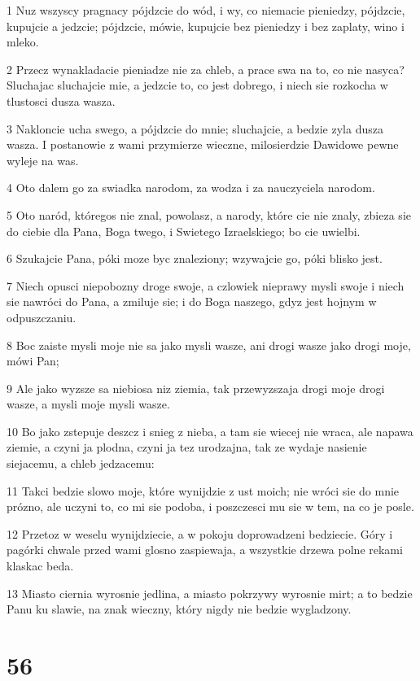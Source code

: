 \par 1 Nuz wszyscy pragnacy pójdzcie do wód, i wy, co niemacie pieniedzy, pójdzcie, kupujcie a jedzcie; pójdzcie, mówie, kupujcie bez pieniedzy i bez zaplaty, wino i mleko.
\par 2 Przecz wynakladacie pieniadze nie za chleb, a prace swa na to, co nie nasyca? Sluchajac sluchajcie mie, a jedzcie to, co jest dobrego, i niech sie rozkocha w tlustosci dusza wasza.
\par 3 Nakloncie ucha swego, a pójdzcie do mnie; sluchajcie, a bedzie zyla dusza wasza. I postanowie z wami przymierze wieczne, milosierdzie Dawidowe pewne wyleje na was.
\par 4 Oto dalem go za swiadka narodom, za wodza i za nauczyciela narodom.
\par 5 Oto naród, któregos nie znal, powolasz, a narody, które cie nie znaly, zbieza sie do ciebie dla Pana, Boga twego, i Swietego Izraelskiego; bo cie uwielbi.
\par 6 Szukajcie Pana, póki moze byc znaleziony; wzywajcie go, póki blisko jest.
\par 7 Niech opusci niepobozny droge swoje, a czlowiek nieprawy mysli swoje i niech sie nawróci do Pana, a zmiluje sie; i do Boga naszego, gdyz jest hojnym w odpuszczaniu.
\par 8 Boc zaiste mysli moje nie sa jako mysli wasze, ani drogi wasze jako drogi moje, mówi Pan;
\par 9 Ale jako wyzsze sa niebiosa niz ziemia, tak przewyzszaja drogi moje drogi wasze, a mysli moje mysli wasze.
\par 10 Bo jako zstepuje deszcz i snieg z nieba, a tam sie wiecej nie wraca, ale napawa ziemie, a czyni ja plodna, czyni ja tez urodzajna, tak ze wydaje nasienie siejacemu, a chleb jedzacemu:
\par 11 Takci bedzie slowo moje, które wynijdzie z ust moich; nie wróci sie do mnie prózno, ale uczyni to, co mi sie podoba, i poszczesci mu sie w tem, na co je posle.
\par 12 Przetoz w weselu wynijdziecie, a w pokoju doprowadzeni bedziecie. Góry i pagórki chwale przed wami glosno zaspiewaja, a wszystkie drzewa polne rekami klaskac beda.
\par 13 Miasto ciernia wyrosnie jedlina, a miasto pokrzywy wyrosnie mirt; a to bedzie Panu ku slawie, na znak wieczny, który nigdy nie bedzie wygladzony.

\chapter{56}

